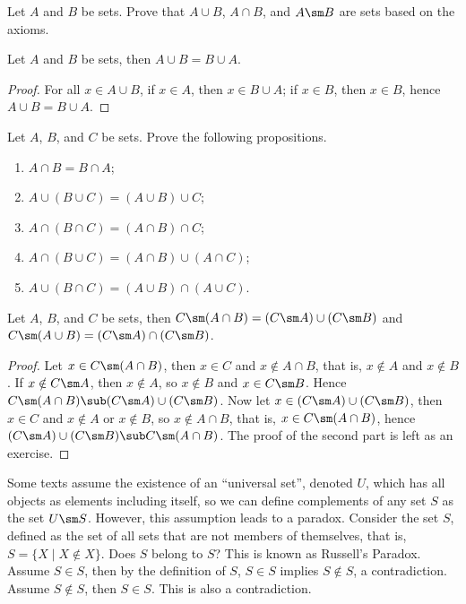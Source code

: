 \documentclass[10pt]{article}
\begin{document}
\begin{problem}
    Let $A$ and $B$ be sets. Prove that $A\cup B$, $A\cap B$, and $A\sm B$ are sets based on the axioms.
\end{problem}
\begin{proposition}
    Let $A$ and $B$ be sets, then $A\cup B=B\cup A$.
\end{proposition}
\begin{proof}
    For all $x\in A\cup B$, if $x\in A$, then $x\in B\cup A$; if $x\in B$, then $x\in B$, hence $A\cup B=B\cup A$.
\end{proof}
\begin{problem}
    Let $A$, $B$, and $C$ be sets. Prove the following propositions.
    \begin{enumerate}
        \item $A\cap B=B\cap A$;
        \item $A\cup(B\cup C)=(A\cup B)\cup C$;
        \item $A\cap(B\cap C)=(A\cap B)\cap C$;
        \item $A\cap(B\cup C)=(A\cap B)\cup(A\cap C)$;
        \item $A\cup(B\cap C)=(A\cup B)\cap(A\cup C)$.
    \end{enumerate}
\end{problem}
\begin{theorem}
    Let $A$, $B$, and $C$ be sets, then $C\sm(A\cap B)=(C\sm A)\cup(C\sm B)$ and $C\sm(A\cup B)=(C\sm A)\cap(C\sm B)$.
\end{theorem}
\begin{proof}
    Let $x\in C\sm(A\cap B)$, then $x\in C$ and $x\notin A\cap B$, that is, $x\notin A$ and $x\notin B$. If $x\notin C\sm A$, then $x\notin A$, so $x\notin B$ and $x\in C\sm B$. Hence $C\sm(A\cap B)\sub(C\sm A)\cup(C\sm B)$. Now let $x\in(C\sm A)\cup(C\sm B)$, then $x\in C$ and $x\notin A$ or $x\notin B$, so $x\notin A\cap B$, that is, $x\in C\sm(A\cap B)$, hence $(C\sm A)\cup(C\sm B)\sub C\sm(A\cap B)$. The proof of the second part is left as an exercise.
\end{proof}
\par
Some texts assume the existence of an ``universal set'', denoted $U$, which has all objects as elements including itself, so we can define complements of any set $S$ as the set $U\sm S$. However, this assumption leads to a paradox. Consider the set $S$, defined as the set of all sets that are not members of themselves, that is, $S=\{X\mid X\notin X\}$. Does $S$ belong to $S$? This is known as Russell's Paradox. Assume $S\in S$, then by the definition of $S$, $S\in S$ implies $S\notin S$, a contradiction. Assume $S\notin S$, then $S\in S$. This is also a contradiction.
\end{document}
